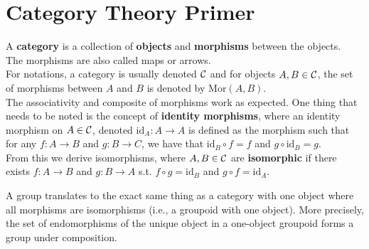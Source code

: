 \chapter{Category Theory Primer}
\label{cha:category-theory-primer}

\begin{definition}
    A \textbf{category} is a collection of \textbf{objects} and \textbf{morphisms} between the objects.\\
    The morphisms are also called maps or arrows.\\
    For notations, a category is usually denoted $\mathcal{C}$ and for objects $A, B \in \mathcal{C}$, the set of morphisms between $A$ and $B$ is denoted by $\text{Mor}(A, B)$.\\
    The associativity and composite of morphisms work as expected. One thing that needs to be noted is the concept of \textbf{identity morphisms}, where an identity morphism on $A \in \mathcal{C}$, denoted $\text{id}_A: A \rightarrow A$ is defined as the morphism such that for any $f: A \rightarrow B$ and $g: B \rightarrow C$, we have that $\text{id}_B \circ f = f$ and $g \circ \text{id}_B = g$.\\
    From this we derive isomorphisms, where $A, B \in \mathcal{C}$ are \textbf{isomorphic} if there exists $f: A \rightarrow B$ and $g: B \rightarrow A$ s.t. $f \circ g = \text{id}_B$ and $g \circ f = \text{id}_A$.
\end{definition}

\begin{proposition}[FoAG 1.1.A]
    \label{prop:group_eqv_one_obj_groupoid}
    \leanok
    A group translates to the exact same thing as a category with one object where all morphisms are isomorphisms (i.e., a groupoid with one object).
    More precisely, the set of endomorphisms of the unique object in a one-object groupoid forms a group under composition.
\end{proposition}


